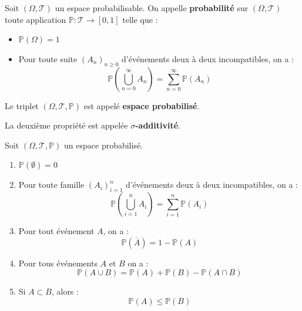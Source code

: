 \documentclass[a4paper, 12pt]{article}
\begin{document}
\begin{definition}
    Soit $(\Omega, \mathcal{T})$ un espace probabilisable.
    On appelle \textbf{probabilité} sur $(\Omega, \mathcal{T})$ toute application $\mathbb{P} : \mathcal{T} \to [0, 1]$ telle que :
    \begin{itemize}[label=--]
        \item $\mathbb{P}(\Omega) = 1$
        \item Pour toute suite $(A_n)_{n \geq 0}$ d'événements deux à deux incompatibles, on a :
        $$
        \mathbb{P}\left(\bigcup\limits_{n = 0}^\infty A_n\right) = \sum\limits_{n = 0}^\infty \mathbb{P}(A_n)
        $$
    \end{itemize}
    Le triplet $(\Omega, \mathcal{T}, \mathbb{P})$ est appelé \textbf{espace probabilisé}.
\end{definition}

\begin{remarque}
    La deuxième propriété est appelée \textbf{$\sigma$-additivité}.
\end{remarque}

\begin{proposition}{}{}
    Soit $(\Omega, \mathcal{T}, \mathbb{P})$ un espace probabilisé.
    \begin{enumerate}[label=(\roman*)]
        \item $\mathbb{P}(\emptyset) = 0$
        \item Pour toute famille $(A_i)_{i = 1}^n$ d'événements deux à deux incompatibles, on a :
        $$
        \mathbb{P}\left(\bigcup\limits_{i = 1}^n A_i\right) = \sum\limits_{i = 1}^n \mathbb{P}(A_i)
        $$
        \item Pour tout événement $A$, on a :
        $$
        \mathbb{P}(\overline{A}) = 1 - \mathbb{P}(A)
        $$
        \item Pour tous événements $A$ et $B$ on a :
        $$
        \mathbb{P}(A \cup B) = \mathbb{P}(A) + \mathbb{P}(B) - \mathbb{P}(A \cap B)
        $$
        \item Si $A \subset B$, alors :
        $$
        \mathbb{P}(A) \leq \mathbb{P}(B)
        $$
    \end{enumerate}
\end{proposition}
\end{document}
